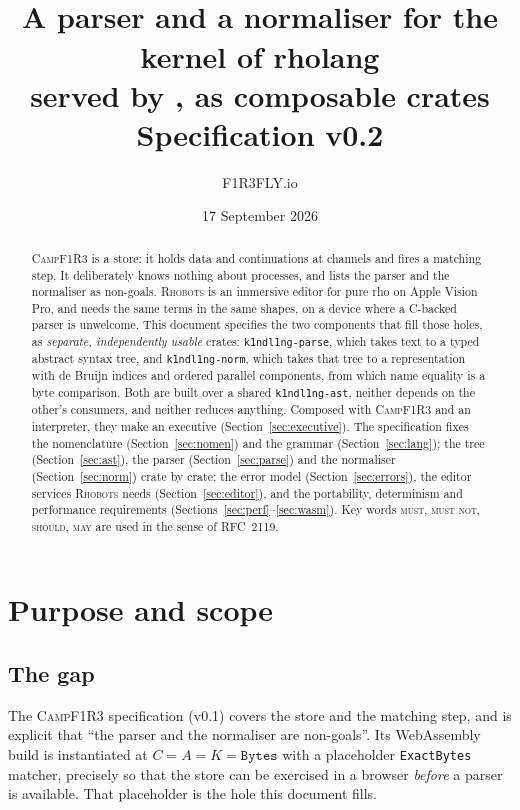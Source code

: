 \documentclass[11pt,a4paper]{article}
\title{\textbf{\Kind}\\[1mm]
\large A parser and a normaliser for the kernel of rholang\\
served by \Camp, as composable crates\\[2mm]
\normalsize Specification v0.2}
\author{F1R3FLY.io}
\date{17 September 2026}
\newcommand{\code}[1]{\texttt{#1}}
\newcommand{\Camp}{\textsc{CampF1R3}}
\newcommand{\Rhobots}{\textsc{Rhobots}}
\newcommand{\MUST}{\textsc{must}}
\newcommand{\MUSTNOT}{\textsc{must not}}
\newcommand{\SHOULD}{\textsc{should}}
\newcommand{\MAY}{\textsc{may}}
\theoremstyle{definition}
\theoremstyle{plain}
\begin{document}
\maketitle
\begin{abstract}
\noindent
\Camp{} is a store: it holds data and continuations at channels and fires a
matching step. It deliberately knows nothing about processes, and lists the
parser and the normaliser as non-goals. \Rhobots{} is an immersive editor for
pure rho on Apple Vision Pro, and needs the same terms in the same shapes, on a
device where a C-backed parser is unwelcome. This document specifies the two
components that fill those holes, as \emph{separate, independently usable}
crates: \code{k1ndl1ng-parse}, which takes text to a typed abstract syntax tree,
and \code{k1ndl1ng-norm}, which takes that tree to a representation with de
Bruijn indices and ordered parallel components, from which name equality is a
byte comparison. Both are built over a shared \code{k1ndl1ng-ast}, neither
depends on the other's consumers, and neither reduces anything. Composed with
\Camp{} and an interpreter, they make an executive
(Section~\ref{sec:executive}). The specification fixes the nomenclature
(Section~\ref{sec:nomen}) and the grammar (Section~\ref{sec:lang}); the tree
(Section~\ref{sec:ast}), the parser (Section~\ref{sec:parse}) and the normaliser
(Section~\ref{sec:norm}) crate by crate; the error model
(Section~\ref{sec:errors}), the editor services \Rhobots{} needs
(Section~\ref{sec:editor}), and the portability, determinism and performance
requirements (Sections~\ref{sec:perf}--\ref{sec:wasm}).
Key words \MUST, \MUSTNOT, \SHOULD, \MAY{} are used in the sense of RFC~2119.
\end{abstract}
\tableofcontents
\section{Purpose and scope}\label{sec:purpose}

\subsection{The gap}

The \Camp{} specification (v0.1) covers the store and the matching step, and is
explicit that ``the parser and the normaliser are non-goals''. Its WebAssembly
build is instantiated at $C=A=K=\code{Bytes}$ with a placeholder
\code{ExactBytes} matcher, precisely so that the store can be exercised in a
browser \emph{before} a parser is available. That placeholder is the hole this
document fills.
\end{document}
